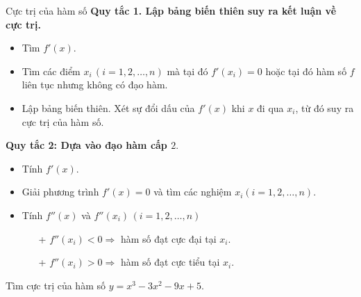 \begin{dang}{Cực trị của hàm số}
	{\bf Quy tắc 1. Lập bảng biến thiên suy ra kết luận về cực trị.}
	\begin{itemize}
		\item Tìm $f'(x).$ 
		\item Tìm các điểm $x_i \,(i=1,2,\ldots,n )$ mà tại đó $f'(x_i)=0$ hoặc tại đó hàm số $f$ liên tục nhưng không có đạo hàm.
		\item Lập bảng biến thiên. Xét sự đổi dấu của $f'(x)$ khi $x$ đi qua $x_i$, từ đó suy ra cực trị của hàm số.  
	\end{itemize}
	{\bf Quy tắc 2: Dựa vào đạo hàm cấp $ 2. $}
	\begin{itemize}
		\item Tính $f'(x)$. 
		\item Giải phương trình $f'(x)=0$ và tìm các nghiệm $x_i (i=1,2, \ldots, n).$
		\item Tính $f''(x)$ và $f''(x_i)\, (i=1,2,\ldots, n)$
		\begin{itemize}
			\item[+] $f''(x_i)<0 \Rightarrow $ hàm số đạt cực đại tại $x_i.$
			\item[+] $f''(x_i)>0\Rightarrow $ hàm số đạt cực tiểu tại $x_i.$
		\end{itemize} 
	\end{itemize}
\end{dang}
\begin{vd}%
	Tìm cực trị của hàm số $ y=x^3-3x^2-9x+5. $
\end{vd}


